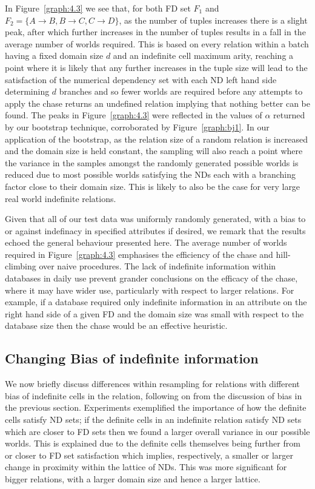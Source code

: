 In Figure~\ref{graph:4.3} we see that, for both FD set $F_1$ and 
$F_2 = \{ A \to B, B \to C, C \to D \}$, as the number of tuples
increases there is a slight peak, after which further increases in the number
of tuples results in a fall in the average number of worlds required.
This is based on every relation within a batch having a fixed domain
size $d$ and an indefinite cell maximum arity, reaching a point where it is
likely that any further increases in the tuple size will lead to the
satisfaction of the numerical dependency set with each ND left hand
side determining $d$ branches and so fewer worlds are required before any 
attempts to apply the chase returns an undefined relation implying that
nothing better can be found. The peaks in Figure~\ref{graph:4.3} were
reflected in the values 
of $\alpha$ returned by our bootstrap technique, corroborated by
Figure~\ref{graph:bj1}. In our
application of the bootstrap, as the relation size of a random relation 
is increased and the domain size is held constant, the sampling will also
reach a point where the variance in the samples amongst the randomly
generated possible worlds is reduced due to most possible worlds 
satisfying the NDs each with a branching factor close to their domain
size. This is likely to also be the case for very large real world
indefinite relations.

\medskip

Given that all of our test data was uniformly randomly generated, with
a bias to or against indefinacy in specified attributes if desired, we
remark that the results echoed the general behaviour
presented here. The average number of worlds required in
Figure~\ref{graph:4.3} emphasises the efficiency of the chase and
hill-climbing over naive procedures.
The lack of indefinite information within databases in daily use prevent
grander conclusions on the efficacy of the chase, where it may have
wider use, particularly with respect to larger relations. For
example, if a database required only indefinite 
information in an attribute on the right hand side of a given FD and
the domain size was small with respect to the database size then the
chase would be an effective heuristic.

\subsection{Changing Bias of indefinite information}\label{subsec:cp_bias}
We now briefly discuss differences within resampling for relations
with different bias of indefinite cells in the relation, following on
from the discussion of bias in the previous section. 
Experiments exemplified the importance of how the definite cells
satisfy ND sets; if the definite cells in an indefinite relation
satisfy ND sets which are closer to FD sets then we found a larger
overall variance in our possible worlds.
This is
explained due to the definite cells themselves being further from or
closer to FD set satisfaction which implies, respectively, a smaller
or larger change in proximity within the lattice of NDs. This was
more significant for bigger relations, with a larger domain size and
hence a larger lattice.

